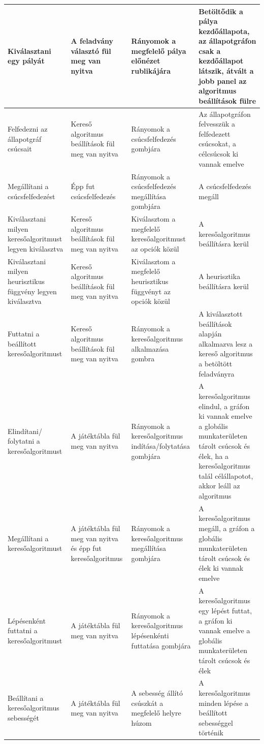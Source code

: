 \begin{center}
\begin{longtable}{ | p{} | p{} | p{} | p{} | }
\hline
\endfoot
\endlastfoot
Kiválasztani egy pályát & A feladvány választó fül meg van nyitva & Rányomok a megfelelő pálya előnézet rublikájára & Betöltődik a pálya kezdőállapota, az állapotgráfon csak a kezdőállapot látszik, átvált a jobb panel az algoritmus beállítások fülre \\ \hline
Felfedezni az állapotgráf csúcsait & Kereső algoritmus beállítások fül meg van nyitva & Rányomok a csúcsfelfedezés gombjára & Az állapotgráfon felvesszük a felfedezett csúcsokat, a célcsúcsok ki vannak emelve \\ \hline
Megállítani a csúcsfelfedezést & Épp fut csúcsfelfedezés & Rányomok a csúcsfelfedezés megállítása gombjára & A csúcsfelfedezés megáll \\ \hline
Kiválasztani milyen keresőalgoritmust legyen kiválasztva & Kereső algoritmus beállítások fül meg van nyitva & Kiválasztom a megfelelő keresőalgoritmust az opciók közül & A keresőalgoritmus beállításra kerül \\ \hline
Kiválasztani milyen heurisztikus függvény legyen kiválasztva & Kereső algoritmus beállítások fül meg van nyitva & Kiválasztom a megfelelő heurisztikus függvényt az opciók közül & A heurisztika beállításra kerül \\ \hline
Futtatni a beállított keresőalgoritmust & Kereső algoritmus beállítások fül meg van nyitva & Rányomok a keresőalgoritmus alkalmazása gombra & A kiválasztott beállítások alapján alkalmazva lesz a kereső algoritmus a betöltött feladványra \\ \hline
Elindítani/ folytatni a keresőalgoritmust & A játéktábla fül meg van nyitva & Rányomok a keresőalgoritmus indítása/folytatása gombjára & A keresőalgoritmus elindul, a gráfon ki vannak emelve a globális munkaterületen tárolt csúcsok és élek, ha a keresőalgoritmus talál célállapotot, akkor leáll az algoritmus \\ \hline
Megállítani a keresőalgoritmust & A játéktábla fül meg van nyitva és épp fut keresőalgoritmus & Rányomok a keresőalgoritmus megállítása gombjára & A keresőalgoritmus megáll, a gráfon a globális munkaterületen tárolt csúcsok és élek ki vannak emelve \\ \hline
Lépésenként futtatni a keresőalgoritmust & A játéktábla fül meg van nyitva & Rányomok a keresőalgoritmus lépésenkénti futtatása gombjára & A keresőalgoritmus egy lépést futtat, a gráfon ki vannak emelve a globális munkaterületen tárolt csúcsok és élek \\ \hline
Beállítani a keresőalgoritmus sebességét & A játéktábla fül meg van nyitva & A sebesség állító csúszkát a megfelelő helyre húzom & A keresőalgoritmus minden lépése a beállított sebességgel történik \\ \hline

\end{longtable}
\end{center}
